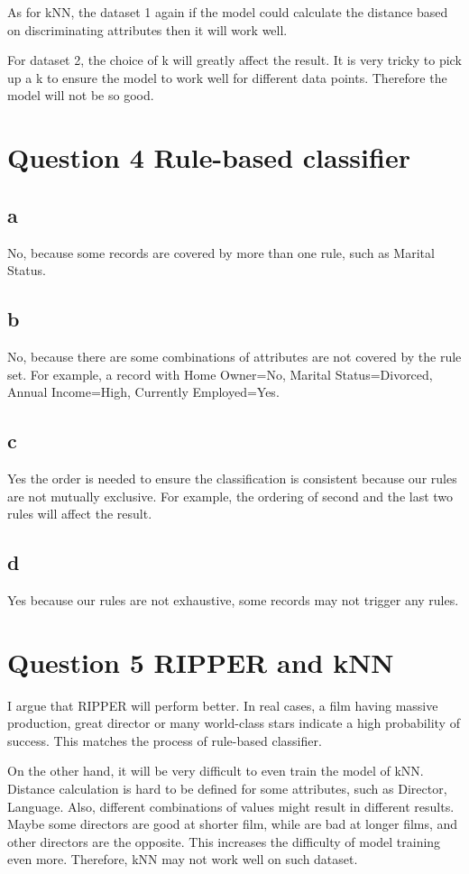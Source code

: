 \documentclass[paper=a4, fontsize=11pt]{scrartcl} %
\begin{document}
As for kNN, the dataset 1 again if the model could calculate the distance based on discriminating attributes then it will work well. 

For dataset 2, the choice of k will greatly affect the result. It is very tricky to pick up a k to ensure the model to work well for different data points. Therefore the model will not be so good.

\section*{Question 4 Rule-based classifier}

\subsection*{a}

No, because some records are covered by more than one rule, such as Marital Status.

\subsection*{b}

No, because there are some combinations of attributes are not covered by the rule set. For example, a record with Home Owner=No, Marital Status=Divorced, Annual Income=High, Currently Employed=Yes.

\subsection*{c}

Yes the order is needed to ensure the classification is consistent because our rules are not mutually exclusive. For example, the ordering of second and the last two rules will affect the result.

\subsection*{d}

Yes because our rules are not exhaustive, some records may not trigger any rules.

\section*{Question 5 RIPPER and kNN}

I argue that RIPPER will perform better. In real cases, a film having massive production, great director or many world-class stars indicate a high probability of success. This matches the process of rule-based classifier.

On the other hand, it will be very difficult to even train the model of kNN. Distance calculation is hard to be defined for some attributes, such as Director, Language. Also, different combinations of values might result in different results. Maybe some directors are good at shorter film, while are bad at longer films, and other directors are the opposite. This increases the difficulty of model training even more. Therefore, kNN may not work well on such dataset.
\end{document}
